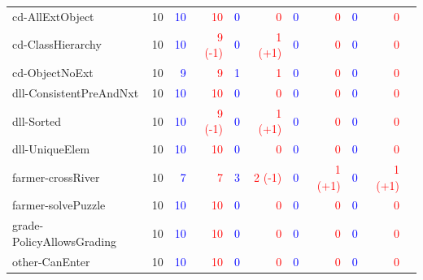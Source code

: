 \documentclass{article}
\begin{document}
\begin{table}[ht]
{\begin{tabular}{lrrrrrrrrrr}
cd-AllExtObject                & 10 & \textcolor{blue}{10}  & \textcolor{red}{10}   & \textcolor{blue}{0}  & \textcolor{red}{0}   & \textcolor{blue}{0}  & \textcolor{red}{0}   & \textcolor{blue}{0}  & \textcolor{red}{0}   \\
cd-ClassHierarchy              & 10 & \textcolor{blue}{10}  & \textcolor{red}{9 (-1)}   & \textcolor{blue}{0}  & \textcolor{red}{1 (+1)}   & \textcolor{blue}{0}  & \textcolor{red}{0}   & \textcolor{blue}{0}  & \textcolor{red}{0}   \\
cd-ObjectNoExt                 & 10 & \textcolor{blue}{9}  & \textcolor{red}{9}   & \textcolor{blue}{1}  & \textcolor{red}{1}   & \textcolor{blue}{0}  & \textcolor{red}{0}   & \textcolor{blue}{0}  & \textcolor{red}{0}   \\
dll-ConsistentPreAndNxt        & 10 & \textcolor{blue}{10}  & \textcolor{red}{10}   & \textcolor{blue}{0}  & \textcolor{red}{0}   & \textcolor{blue}{0}  & \textcolor{red}{0}   & \textcolor{blue}{0}  & \textcolor{red}{0}   \\
dll-Sorted                     & 10 & \textcolor{blue}{10}  & \textcolor{red}{9 (-1)}   & \textcolor{blue}{0}  & \textcolor{red}{1 (+1)}   & \textcolor{blue}{0}  & \textcolor{red}{0}   & \textcolor{blue}{0}  & \textcolor{red}{0}   \\
dll-UniqueElem                 & 10 & \textcolor{blue}{10}  & \textcolor{red}{10}   & \textcolor{blue}{0}  & \textcolor{red}{0}   & \textcolor{blue}{0}  & \textcolor{red}{0}   & \textcolor{blue}{0}  & \textcolor{red}{0}   \\
farmer-crossRiver              & 10 & \textcolor{blue}{7}  & \textcolor{red}{7}   & \textcolor{blue}{3}  & \textcolor{red}{2 (-1)}   & \textcolor{blue}{0}  & \textcolor{red}{1 (+1)}   & \textcolor{blue}{0}  & \textcolor{red}{1 (+1)}   \\
farmer-solvePuzzle             & 10 & \textcolor{blue}{10}  & \textcolor{red}{10}   & \textcolor{blue}{0}  & \textcolor{red}{0}   & \textcolor{blue}{0}  & \textcolor{red}{0}   & \textcolor{blue}{0}  & \textcolor{red}{0}   \\
grade-PolicyAllowsGrading      & 10 & \textcolor{blue}{10}  & \textcolor{red}{10}   & \textcolor{blue}{0}  & \textcolor{red}{0}   & \textcolor{blue}{0}  & \textcolor{red}{0}   & \textcolor{blue}{0}  & \textcolor{red}{0}   \\
other-CanEnter                 & 10 & \textcolor{blue}{10}  & \textcolor{red}{10}   & \textcolor{blue}{0}  & \textcolor{red}{0}   & \textcolor{blue}{0}  & \textcolor{red}{0}   & \textcolor{blue}{0}  & \textcolor{red}{0}   \\

\end{tabular}}
\end{table}
\end{document}
